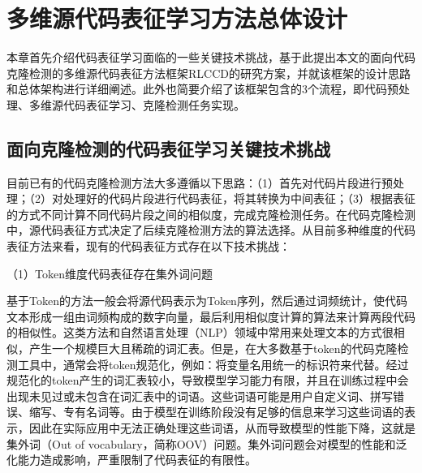 %
%
%
%
%

\chapter{多维源代码表征学习方法总体设计}

本章首先介绍代码表征学习面临的一些关键技术挑战，基于此提出本文的面向代码克隆检测的多维源代码表征方法框架RLCCD的研究方案，并就该框架的设计思路和总体架构进行详细阐述。此外也简要介绍了该框架包含的3个流程，即代码预处理、多维源代码表征学习、克隆检测任务实现。

\section{面向克隆检测的代码表征学习关键技术挑战}
\label{challenges}

目前已有的代码克隆检测方法大多遵循以下思路：（1）首先对代码片段进行预处理；（2）对处理好的代码片段进行代码表征，将其转换为中间表征；（3）根据表征的方式不同计算不同代码片段之间的相似度，完成克隆检测任务。在代码克隆检测中，源代码表征方式决定了后续克隆检测方法的算法选择。从目前多种维度的代码表征方法来看，现有的代码表征方式存在以下技术挑战：

（1）Token维度代码表征存在集外词问题

基于Token的方法一般会将源代码表示为Token序列，然后通过词频统计，使代码文本形成一组由词频构成的数字向量，最后利用相似度计算的算法来计算两段代码的相似性。这类方法和自然语言处理（NLP）领域中常用来处理文本的方式很相似，产生一个规模巨大且稀疏的词汇表。但是，在大多数基于token的代码克隆检测工具中，通常会将token规范化，例如：将变量名用统一的标识符来代替。经过规范化的token产生的词汇表较小，导致模型学习能力有限，并且在训练过程中会出现未见过或未包含在词汇表中的词语。这些词语可能是用户自定义词、拼写错误、缩写、专有名词等。由于模型在训练阶段没有足够的信息来学习这些词语的表示，因此在实际应用中无法正确处理这些词语，从而导致模型的性能下降，这就是集外词（Out of vocabulary，简称OOV）问题。集外词问题会对模型的性能和泛化能力造成影响，严重限制了代码表征的有限性。


